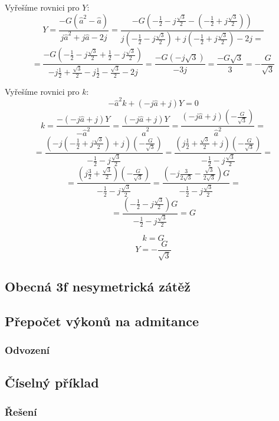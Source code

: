 \documentclass{article}
\begin{document}
Vyřešíme rovnici pro $Y$:
$$
    Y = \frac{- G (\hat{a}^2 - \hat{a})}{j \hat{a}^2 + j \hat{a} - 2 j} = \frac{
        - G \left( -\frac{1}{2} - j \frac{\sqrt{3}}{2} - \left( -\frac{1}{2} + j \frac{\sqrt{3}}{2} \right) \right)
    }{
        j \left( -\frac{1}{2} - j \frac{\sqrt{3}}{2} \right) + j \left( -\frac{1}{2} + j \frac{\sqrt{3}}{2} \right) - 2 j =
    }
$$
$$
    = \frac{
        - G \left( -\frac{1}{2} - j \frac{\sqrt{3}}{2} + \frac{1}{2} - j \frac{\sqrt{3}}{2} \right)
    }{
        -j \frac{1}{2} + \frac{\sqrt{3}}{2} - j \frac{1}{2} - \frac{\sqrt{3}}{2} - 2 j
    } = \frac{
        - G \left( -j \sqrt{3} \right)
    }{
        -3 j
    } = \frac{- G \sqrt{3}}{3} = -\frac{G}{\sqrt{3}}
$$

Vyřešíme rovnici pro $k$:
$$
    -\hat{a}^2 k + (-j \hat{a} + j) Y = 0
$$
$$
    k = \frac{- (-j \hat{a} + j) Y}{-\hat{a}^2} = \frac{(-j \hat{a} + j) Y}{\hat{a}^2} = \frac{(-j \hat{a} + j) \left( -\frac{G}{\sqrt{3}} \right)}{\hat{a}^2} =
$$
$$
    = \frac{
        \left( -j \left( -\frac{1}{2} + j \frac{\sqrt{3}}{2} \right) + j \right) \left( -\frac{G}{\sqrt{3}} \right)
    }{
        -\frac{1}{2} - j \frac{\sqrt{3}}{2}
    } = \frac{
        \left( j \frac{1}{2} + \frac{\sqrt{3}}{2} + j \right) \left( -\frac{G}{\sqrt{3}} \right)
    }{
        -\frac{1}{2} - j \frac{\sqrt{3}}{2}
    } =
$$
$$
    = \frac{
        \left( j \frac{3}{2} + \frac{\sqrt{3}}{2} \right) \left( -\frac{G}{\sqrt{3}} \right)
    }{
        -\frac{1}{2} - j \frac{\sqrt{3}}{2}
    } = \frac{
        \left( - j \frac{3}{2 \sqrt{3}} - \frac{\sqrt{3}}{2 \sqrt{3}} \right) G
    }{
        -\frac{1}{2} - j \frac{\sqrt{3}}{2}
    } =
$$
$$
    = \frac{
        \left( -\frac{1}{2} - j \frac{\sqrt{3}}{2} \right) G
    }{
        -\frac{1}{2} - j \frac{\sqrt{3}}{2}
    } = G
$$

$$
    k = G
$$
$$
    Y = -\frac{G}{\sqrt{3}}
$$


\subsection{Obecná 3f nesymetrická zátěž \spicy \spicy \spicy}


\subsection{Přepočet výkonů na admitance}

\subsubsection{Odvození \spicy \spicy \spicy}




\subsection{Číselný příklad}

\subsubsection{Řešení}
\end{document}
